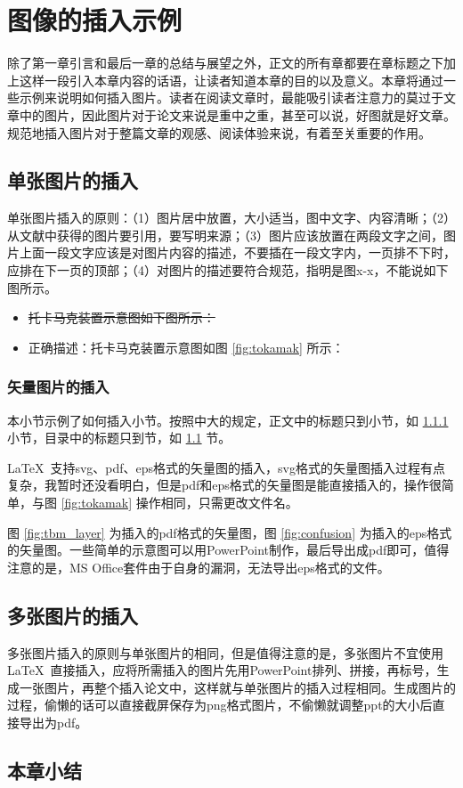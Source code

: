 \chapter{图像的插入示例}
\label{cha:fig_example}
除了第一章引言和最后一章的总结与展望之外，正文的所有章都要在章标题之下加上这样一段引入本章内容的话语，让读者知道本章的目的以及意义。本章将通过一些示例来说明如何插入图片。读者在阅读文章时，最能吸引读者注意力的莫过于文章中的图片，因此图片对于论文来说是重中之重，甚至可以说，好图就是好文章。规范地插入图片对于整篇文章的观感、阅读体验来说，有着至关重要的作用。
\section{单张图片的插入}
\label{sec:fig_singlefig}
单张图片插入的原则：（1）图片居中放置，大小适当，图中文字、内容清晰；（2）从文献中获得的图片要引用，要写明来源；（3）图片应该放置在两段文字之间，图片上面一段文字应该是对图片内容的描述，不要插在一段文字内，一页排不下时，应排在下一页的顶部；（4）对图片的描述要符合规范，指明是图x-x，不能说如下图所示。
\begin{itemize}
\item {\color{red}{错误描述：}} \sout{托卡马克装置示意图如下图所示\cite{xu2016general}：}
\item 正确描述：托卡马克装置示意图如图 \ref{fig:tokamak} 所示\cite{xu2016general}：
\end{itemize}


\subsection{矢量图片的插入}
\label{ssec:fig_vecfig}
本小节示例了如何插入小节。按照中大的规定，正文中的标题只到小节，如 \ref{ssec:fig_vecfig} 小节，目录中的标题只到节，如 \ref{sec:fig_singlefig} 节。

\LaTeX\  支持svg、pdf、eps格式的矢量图的插入，svg格式的矢量图插入过程有点复杂，我暂时还没看明白，但是pdf和eps格式的矢量图是能直接插入的，操作很简单，与图 \ref{fig:tokamak} 操作相同，只需更改文件名。

图 \ref{fig:tbm_layer} 为插入的pdf格式的矢量图，图 \ref{fig:confusion} 为插入的eps格式的矢量图。一些简单的示意图可以用PowerPoint制作，最后导出成pdf即可，值得注意的是，MS Office套件由于自身的漏洞，无法导出eps格式的文件。


\section{多张图片的插入}
\label{sec:fig_multifig}
多张图片插入的原则与单张图片的相同，但是值得注意的是，多张图片不宜使用\LaTeX\ 直接插入，应将所需插入的图片先用PowerPoint排列、拼接，再标号，生成一张图片，再整个插入论文中，这样就与单张图片的插入过程相同。生成图片的过程，偷懒的话可以直接截屏保存为png格式图片，不偷懒就调整ppt的大小后直接导出为pdf。



\section{本章小结}
